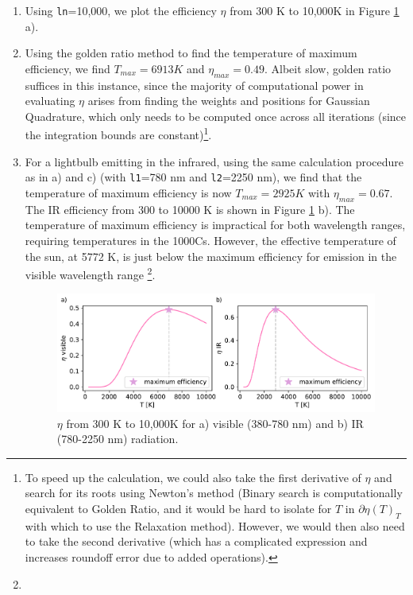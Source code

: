 \documentclass{article}
\newcommand{\code}{\texttt}
\begin{document}
\begin{enumerate}
\begin{enumerate}
  \item Using \code{ln}=10,000, we plot the efficiency $\eta$ from 300 K to 10,000K in Figure \ref{fig:2bd} a). 
  \item Using the golden ratio method to find the temperature of maximum efficiency, we find $T_{max}=6913 K$ and $\eta_{max}=0.49$. Albeit slow, golden ratio suffices in this instance, since the majority of computational power in evaluating $\eta$ arises from finding the weights and positions for Gaussian Quadrature, which only needs to be computed once across all iterations (since the integration bounds are constant)\footnote{To speed up the calculation, we could also take the first derivative of $\eta$ and search for its roots using Newton's method (Binary search is computationally equivalent to Golden Ratio, and it would be hard to isolate for $T$ in $\partial\eta(T)_T$ with which to use the Relaxation method). 
  However, we would then also need to take the second derivative (which has a complicated expression and increases roundoff error due to added operations).}.
  \item For a lightbulb emitting in the infrared, using the same calculation procedure as in a) and c) (with \code{l1}=780 nm and \code{l2}=2250 nm), we find that the temperature of maximum efficiency is now $T_{max}=2925 K$ with $\eta_{max}=0.67$. 
  The IR efficiency from 300 to 10000 K is shown in Figure \ref{fig:2bd} b).
  The temperature of maximum efficiency is impractical for both wavelength ranges, requiring temperatures in the 1000\textdegree Cs. 
  However, the effective temperature of the sun, at 5772 K, is just below the maximum efficiency for emission in the visible wavelength range \footnote{}.
  
  \begin{figure}[h]
    \centering 
    \captionsetup{margin=3.2cm}
    \includegraphics[width=0.8\linewidth]{Q2.pdf}
    \caption{\label{fig:2bd} $\eta$ from 300 K to 10,000K for a) visible (380-780 nm) and b) IR (780-2250 nm) radiation.}
  \end{figure}
\end{enumerate}


\end{enumerate}
\end{document}
